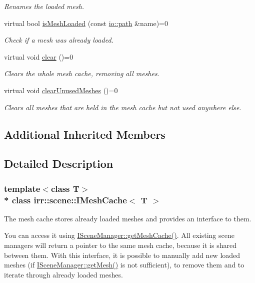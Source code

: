 \begin{DoxyCompactItemize}
\begin{DoxyCompactList}\small\item\em Renames the loaded mesh. \end{DoxyCompactList}\item 
virtual bool \hyperlink{classirr_1_1scene_1_1IMeshCache_a888be60cbdb155443108fb27908c0d51}{is\+Mesh\+Loaded} (const \hyperlink{namespaceirr_1_1io_ab1bdc45edb3f94d8319c02bc0f840ee1}{io\+::path} \&name)=0
\begin{DoxyCompactList}\small\item\em Check if a mesh was already loaded. \end{DoxyCompactList}\item 
virtual void \hyperlink{classirr_1_1scene_1_1IMeshCache_a973742f191f37291e202f2eda51ab444}{clear} ()=0
\begin{DoxyCompactList}\small\item\em Clears the whole mesh cache, removing all meshes. \end{DoxyCompactList}\item 
virtual void \hyperlink{classirr_1_1scene_1_1IMeshCache_aa79e0c6c82e5361b94167f99f7a958c8}{clear\+Unused\+Meshes} ()=0
\begin{DoxyCompactList}\small\item\em Clears all meshes that are held in the mesh cache but not used anywhere else. \end{DoxyCompactList}\end{DoxyCompactItemize}
\subsection*{Additional Inherited Members}


\subsection{Detailed Description}
\subsubsection*{template$<$class T$>$\\*
class irr\+::scene\+::\+I\+Mesh\+Cache$<$ T $>$}

The mesh cache stores already loaded meshes and provides an interface to them. 

You can access it using \hyperlink{classirr_1_1scene_1_1ISceneManager_ac5ffbb676d3c68becfb565cf72e2afa0}{I\+Scene\+Manager\+::get\+Mesh\+Cache()}. All existing scene managers will return a pointer to the same mesh cache, because it is shared between them. With this interface, it is possible to manually add new loaded meshes (if \hyperlink{classirr_1_1scene_1_1ISceneManager_aca1b12117220849983243ee2f73a8f4d}{I\+Scene\+Manager\+::get\+Mesh()} is not sufficient), to remove them and to iterate through already loaded meshes. 

